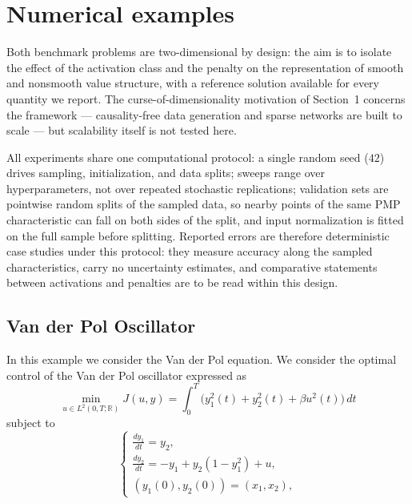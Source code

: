 \documentclass[11pt]{amsart}
\theoremstyle{definition}
\theoremstyle{remark}
\begin{document}
\section{Numerical examples}
Both benchmark problems are two-dimensional by design: the aim is to isolate
the effect of the activation class and the penalty on the representation of
smooth and nonsmooth value structure, with a reference solution available for
every quantity we report. The curse-of-dimensionality motivation of
Section~1 concerns the framework --- causality-free data generation and
sparse networks are built to scale --- but scalability itself is not tested
here.

All experiments share one computational protocol: a single random seed ($42$)
drives sampling, initialization, and data splits; sweeps range over
hyperparameters, not over repeated stochastic replications; validation sets are
pointwise random splits of the sampled data, so nearby points of the same PMP
characteristic can fall on both sides of the split, and input normalization is
fitted on the full sample before splitting. Reported errors are therefore
deterministic case studies under this protocol: they measure accuracy along the
sampled characteristics, carry no uncertainty estimates, and comparative
statements between activations and penalties are to be read within this design.

\subsection{Van der Pol Oscillator}
In this example we consider the Van der Pol equation.
We consider the optimal control of the Van der Pol oscillator expressed as
\begin{equation*}
\min_{u \in L^2(0, T; \mathbb{R})} J(u, y) = \int_0^T \big( y_1^2(t) + y_2^2(t) + \beta u^2(t) \big) \, dt
\end{equation*}
subject to
\begin{equation*}
\begin{cases}
\frac{dy_1}{dt} = y_2, \\
\frac{dy_2}{dt} = -y_1 + y_2(1 - y_1^2) + u, \\
(y_1(0), y_2(0)) = (x_1, x_2),
\end{cases}
\end{equation*}
\end{document}
